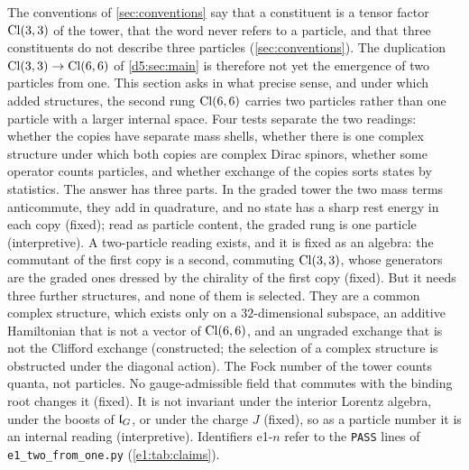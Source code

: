 The conventions of \cref{sec:conventions} say that a constituent is a tensor factor $\mathrm{Cl}(3,3)$ of the tower, that the word never refers to a
particle, and that three constituents do not describe three particles (\cref{sec:conventions}). The duplication
$\mathrm{Cl}(3,3)\to\mathrm{Cl}(6,6)$ of \cref{d5:sec:main} is therefore not yet the emergence of two particles from one. This section
asks in what precise sense, and under which added structures, the second rung $\mathrm{Cl}(6,6)$ carries two particles rather than one
particle with a larger internal space. Four tests separate the two readings: whether the copies have separate mass shells, whether
there is one complex structure under which both copies are complex Dirac spinors, whether some operator counts particles, and whether
exchange of the copies sorts states by statistics. The answer has three parts. In the graded tower the two mass
terms anticommute, they add in quadrature, and no state has a sharp rest energy in each copy (fixed); read as particle content, the graded
rung is one particle (interpretive). A two-particle reading exists, and
it is fixed as an algebra: the commutant of the first copy is a second, commuting $\mathrm{Cl}(3,3)$, whose generators are the graded ones
dressed by the chirality of the first copy (fixed). But it needs three further structures, and none of them is selected. They are
a common complex structure, which exists only on a $32$-dimensional subspace, an additive Hamiltonian that is not a vector of
$\mathrm{Cl}(6,6)$, and an ungraded exchange that is not the Clifford exchange (constructed; the selection of a complex structure is obstructed
under the diagonal action). The Fock number of the tower counts quanta, not particles. No gauge-admissible field that commutes with the
binding root changes it (fixed). It is not invariant under the interior Lorentz algebra, under the boosts of $\mathfrak l_G$, or under the
charge $J$ (fixed), so as a particle number it is an internal reading (interpretive). Identifiers e1-$n$ refer to the \texttt{PASS} lines of
\texttt{e1\_two\_from\_one.py} (\cref{e1:tab:claims}).

